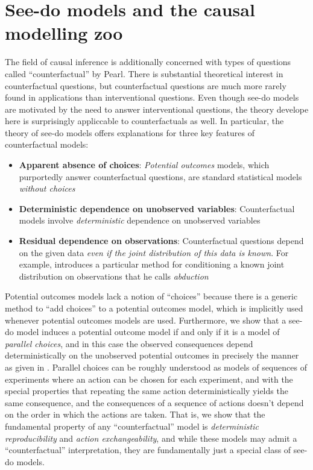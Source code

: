 
\chapter{See-do models and the causal modelling zoo}\label{ch:4}


The field of causal inference is additionally concerned with types of questions called ``counterfactual'' by Pearl. There is substantial theoretical interest in counterfactual questions, but counterfactual questions are much more rarely found in applications than interventional questions. Even though see-do models are motivated by the need to answer interventional questions, the theory develope here is surprisingly appliccable to counterfactuals as well. In particular, the theory of see-do models offers explanations for three key features of counterfactual models:
\begin{itemize}
    \item \textbf{Apparent absence of choices}: \emph{Potential outcomes} models, which purportedly answer counterfactual questions, are standard statistical models \emph{without choices} \citep{rubin_causal_2005}
    \item \textbf{Deterministic dependence on unobserved variables}: Counterfactual models involve \emph{deterministic} dependence on unobserved variables \citep{pearl_causality:_2009,rubin_causal_2005,richardson2013single}
    \item \textbf{Residual dependence on observations}: Counterfactual questions depend on the given data \emph{even if the joint distribution of this data is known}. For example, \citet{pearl_causality:_2009} introduces a particular method for conditioning a known joint distribution on observations that he calls \emph{abduction}
\end{itemize}

Potential outcomes models lack a notion of ``choices'' because there is a generic method to ``add choices'' to a potential outcomes model, which is implicitly used whenever potential outcomes models are used. Furthermore, we show that a see-do model induces a potential outcome model if and only if it is a model of \emph{parallel choices}, and in this case the observed consequences depend deterministically on the unobserved potential outcomes in precisely the manner as given in \citet{rubin_causal_2005}. Parallel choices can be roughly understood as models of sequences of experiments where an action can be chosen for each experiment, and with the special properties that repeating the same action deterministically yields the same consequence, and the consequences of a sequence of actions doesn't depend on the order in which the actions are taken. That is, we show that the fundamental property of any ``counterfactual'' model is \emph{deterministic reproducibility} and \emph{action exchangeability}, and while these models may admit a ``counterfactual'' interpretation, they are fundamentally just a special class of see-do models.

